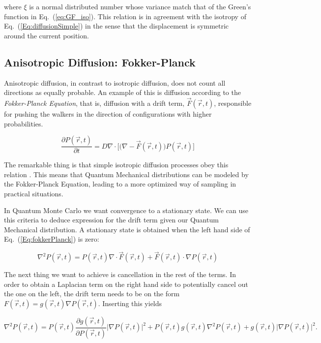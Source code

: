 where $\xi$ is a normal distributed number whose variance match that of the Green's function in Eq.~(\ref{eq:GF_iso}). This relation is in agreement with the isotropy of Eq.~(\ref{Eq:diffusionSimple}) in the sense that the displacement is symmetric around the current position.


\subsection{Anisotropic Diffusion: Fokker-Planck}
\label{sec:anisFokker}

Anisotropic diffusion, in contrast to isotropic diffusion, does not count all directions as equally probable. An example of this is diffusion according to the \textit{Fokker-Planck Equation}, that is, diffusion with a drift term, $\vec F(\vec r, t)$, responsible for pushing the walkers in the direction of configurations with higher probabilities.

\begin{equation}
 \label{Eq:fokkerPlanck}
 \frac{\partial P(\vec r, t)}{\partial t} = D\nabla\cdot\Big[\Big(\nabla - \vec F(\vec r, t)\Big) P(\vec r, t)\Big] 
\end{equation}

The remarkable thing is that simple isotropic diffusion processes obey this relation \cite{abInitioMC}. This means that Quantum Mechanical distributions can be modeled by the Fokker-Planck Equation, leading to a more optimized way of sampling in practical situations. 

In Quantum Monte Carlo we want convergence to a stationary state. We can use this criteria to deduce expression for the drift term given our Quantum Mechanical distribution. A stationary state is obtained when the left hand side of Eq.~(\ref{Eq:fokkerPlanck}) is zero:

\begin{equation*}
 \nabla^2 P(\vec r, t) = P(\vec r, t)\nabla\cdot\vec F(\vec r, t) + \vec F(\vec r, t) \cdot \nabla P(\vec r, t)
\end{equation*}

The next thing we want to achieve is cancellation in the rest of the terms. In order to obtain a Laplacian term on the right hand side to potentially cancel out the one on the left, the drift term needs to be on the form $F(\vec r, t) = g(\vec r, t)\nabla P(\vec r, t)$. Inserting this yields

\begin{equation*}
  \nabla^2 P(\vec r, t) = P(\vec r, t)\frac{\partial g(\vec r, t)}{\partial P(\vec r, t)}\Big|\nabla P(\vec r, t)\Big|^2
  + P(\vec r, t)g(\vec r, t)\nabla^2 P(\vec r, t) + g(\vec r, t) \Big|\nabla P(\vec r, t)\Big|^2.
\end{equation*}

